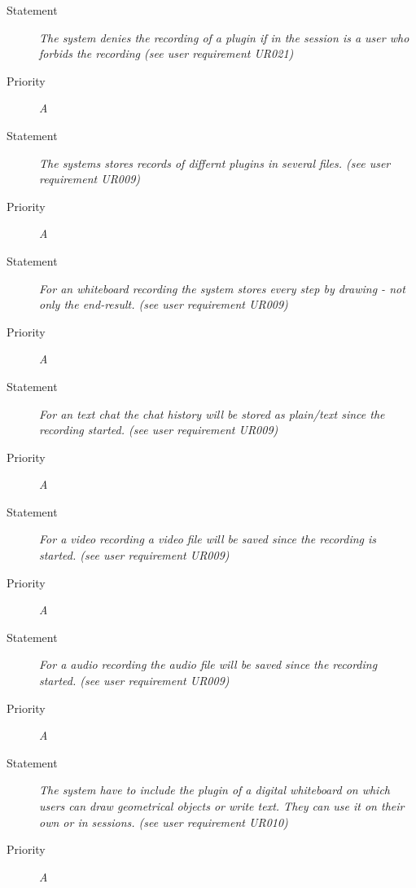 \FR
\begin{description}
  \item [Statement] 
    \textit{The system denies the recording of a plugin if in the session is a user who forbids the recording
    (see user requirement UR021)}
  \item [Priority] \textit{A}
\end{description}

\FR
\begin{description}
  \item [Statement] 
    \textit{The systems stores records of differnt plugins in several files.
    (see user requirement UR009)}
  \item [Priority] \textit{A}
\end{description}

\FR
\begin{description}
  \item [Statement] 
    \textit{For an whiteboard recording the system stores every step by drawing - not only the end-result.
    (see user requirement UR009)}
  \item [Priority] \textit{A}
\end{description}

\FR
\begin{description}
  \item [Statement] 
    \textit{For an text chat the chat history will be stored as plain/text since the recording started.
    (see user requirement UR009)}
  \item [Priority] \textit{A}
\end{description}

\FR
\begin{description}
  \item [Statement] 
    \textit{For a video recording a video file will be saved since the recording is started.
    (see user requirement UR009)}
  \item [Priority] \textit{A}
\end{description}

\FR
\begin{description}
  \item [Statement] 
    \textit{For a audio recording the audio file will be saved since the recording started.
    (see user requirement UR009)}
  \item [Priority] \textit{A}
\end{description}

\FR
\begin{description}
  \item [Statement] 
    \textit{The system have to include the plugin of a digital whiteboard on which users can draw geometrical objects or write text. They can use it on their own or in sessions.
    (see user requirement UR010)}
  \item [Priority] \textit{A}
\end{description}

